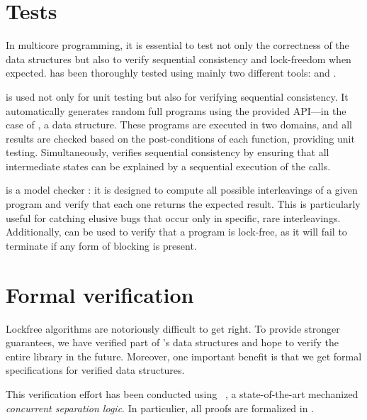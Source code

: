 \documentclass[a4paper, 11pt]{article}
\begin{document}



\section{Tests}
In multicore programming, it is essential to test not only the correctness of the data structures but also to verify sequential consistency and lock-freedom when expected. \Saturn has been thoroughly tested using mainly two different tools: \dscheck and \STM. 

\STM is used not only for unit testing but also for verifying sequential consistency. It automatically generates random full programs using the provided API—in the case of \Saturn, a data structure. These programs are executed in two domains, and all results are checked based on the post-conditions of each function, providing unit testing. Simultaneously, \STM verifies sequential consistency by ensuring that all intermediate states can be explained by a sequential execution of the calls.

\dscheck is a model checker : it is designed to compute all possible interleavings of a given program and verify that each one returns the expected result. This is particularly useful for catching elusive bugs that occur only in specific, rare interleavings. Additionally, \dscheck can be used to verify that a program is lock-free, as it will fail to terminate if any form of blocking is present.

\section{Formal verification}

Lockfree algorithms are notoriously difficult to get right.
To provide stronger guarantees, we have verified part of \Saturn's data structures and hope to verify the entire library in the future.
Moreover, one important benefit is that we get formal specifications for verified data structures.

This verification effort has been conducted using \Iris~\cite{DBLP:journals/jfp/JungKJBBD18}, a state-of-the-art mechanized \emph{concurrent separation logic}.
In particulier, all proofs are formalized in \Coq.
\end{document}
